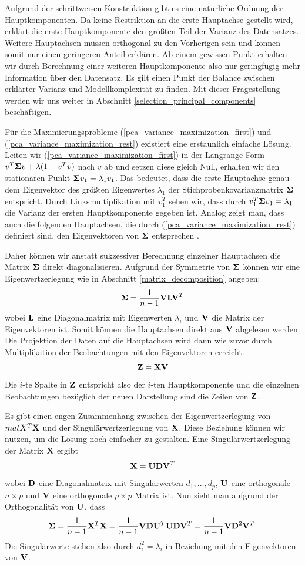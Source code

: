 Aufgrund der schrittweisen Konstruktion gibt es eine natürliche Ordnung der Hauptkomponenten. Da keine Restriktion an die erste Hauptachse gestellt wird, erklärt die erste Hauptkomponente den größten Teil der Varianz des Datensatzes. Weitere Hauptachsen müssen orthogonal zu den Vorherigen sein und können somit nur einen geringeren Anteil erklären. Ab einem gewissen Punkt erhalten wir durch Berechnung einer weiteren Hauptkomponente also nur geringfügig mehr Information über den Datensatz. Es gilt einen Punkt der Balance zwischen erklärter Varianz und Modellkomplexität zu finden. Mit dieser Fragestellung werden wir uns weiter in Abschnitt \ref{selection_principal_components} beschäftigen.

Für die Maximierungsprobleme (\ref{pca_variance_maximization_first}) und (\ref{pca_variance_maximization_rest}) existiert eine erstaunlich einfache Lösung. Leiten wir (\ref{pca_variance_maximization_first}) in der Langrange-Form $v^T\mathbf{\Sigma}v + \lambda (1-v^Tv)$ nach $v$ ab und setzen diese gleich Null, erhalten wir den stationären Punkt $\mathbf{\Sigma}v_1 = \lambda_1 v_1$. Das bedeutet, dass die erste Hauptachse genau dem Eigenvektor des größten Eigenwertes $\lambda_1$ der Stichprobenkovarianzmatrix $\mathbf{\Sigma}$ entspricht. Durch Linksmultiplikation mit $v_1^T$ sehen wir, dass durch 
$v_1^T\mathbf{\Sigma}v_1 = \lambda_1$ die Varianz der ersten Hauptkomponente  gegeben ist. Analog zeigt man, dass auch die folgenden Hauptachsen, die durch (\ref{pca_variance_maximization_rest}) definiert sind, den Eigenvektoren von $\mathbf{\Sigma}$ entsprechen \cite{bishop}.

Daher können wir anstatt sukzessiver Berechnung einzelner Hauptachsen die Matrix $\mathbf{\Sigma}$ direkt diagonalisieren. Aufgrund der Symmetrie von $\mathbf{\Sigma}$ können wir eine Eigenwertzerlegung wie in Abschnitt \ref{matrix_decomposition} angeben:
$$\mathbf{\Sigma} = \frac{1}{n-1}\mathbf{V} \mathbf{L} \mathbf{V}^T$$
wobei $\mathbf{L}$ eine Diagonalmatrix mit Eigenwerten $\lambda_i$ und $\mathbf{V}$ die Matrix der Eigenvektoren ist. Somit können die Hauptachsen direkt aus $\mathbf{V}$ abgelesen werden. Die Projektion der Daten auf die Hauptachsen wird dann wie zuvor durch Multiplikation der Beobachtungen mit den Eigenvektoren erreicht. 
$$\mathbf{Z} = \mathbf{X} \mathbf{V}$$
Die $i$-te Spalte in $\mathbf{Z}$ entspricht also der $i$-ten Hauptkomponente und die einzelnen Beobachtungen bezüglich der neuen Darstellung sind die Zeilen von $\mathbf{Z}$.

Es gibt einen engen Zusammenhang zwischen der Eigenwertzerlegung von $mat X^T \mathbf{X}$ und der Singulärwertzerlegung von $\mathbf{X}$. Diese Beziehung können wir nutzen, um die Lösung noch einfacher zu gestalten. Eine Singulärwertzerlegung der Matrix $\mathbf{X}$ ergibt
$$ \mathbf{X} = \mathbf{U}\mathbf{D}\mathbf{V}^T $$
wobei $\mathbf{D}$ eine Diagonalmatrix mit Singulärwerten $d_1,\ldots,d_p$, $\mathbf{U}$ eine orthogonale $n \times p$ und $\mathbf{V}$ eine orthogonale $p \times p$ Matrix ist. Nun sieht man aufgrund der Orthogonalität von $\mathbf{U}$, dass
$$\mathbf{\Sigma} = \frac{1}{n-1}\mathbf{X}^T \mathbf{X} = \frac{1}{n-1}\mathbf{V}\mathbf{D}\mathbf{U}^T \mathbf{U}\mathbf{D}\mathbf{V}^T = \frac{1}{n-1}\mathbf{V} \mathbf{D}^2 \mathbf{V}^T.$$
Die Singulärwerte stehen also durch $d_i^2 = \lambda_i$ in Beziehung mit den Eigenvektoren von $\mathbf{V}$. 

